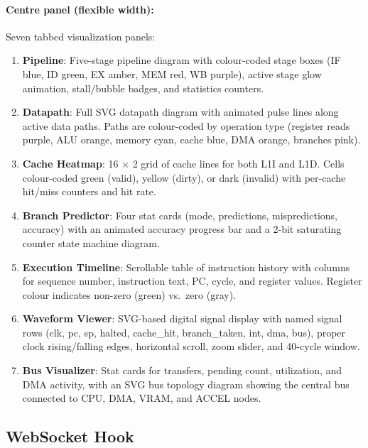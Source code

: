 \documentclass[12pt,a4paper,twoside]{book}
\theoremstyle{trinarytheorem}
\theoremstyle{trinarydefinition}
\begin{document}
\paragraph{Centre panel (flexible width):} Seven tabbed visualization
panels:

\begin{enumerate}
    \item \textbf{Pipeline}: Five-stage pipeline diagram with
          colour-coded stage boxes (IF blue, ID green, EX amber, MEM red,
          WB purple), active stage glow animation, stall/bubble badges,
          and statistics counters.
    \item \textbf{Datapath}: Full SVG datapath diagram with animated
          pulse lines along active data paths. Paths are colour-coded by
          operation type (register reads purple, ALU orange, memory cyan,
          cache blue, DMA orange, branches pink).
    \item \textbf{Cache Heatmap}: 16 $\times$ 2 grid of cache lines for
          both L1I and L1D. Cells colour-coded green (valid), yellow
          (dirty), or dark (invalid) with per-cache hit/miss counters
          and hit rate.
    \item \textbf{Branch Predictor}: Four stat cards (mode, predictions,
          mispredictions, accuracy) with an animated accuracy progress
          bar and a 2-bit saturating counter state machine diagram.
    \item \textbf{Execution Timeline}: Scrollable table of instruction
          history with columns for sequence number, instruction text, PC,
          cycle, and register values. Register colour indicates non-zero
          (green) vs.\ zero (gray).
    \item \textbf{Waveform Viewer}: SVG-based digital signal display
          with named signal rows (clk, pc, sp, halted, cache\_hit,
          branch\_taken, int, dma, bus), proper clock rising/falling
          edges, horizontal scroll, zoom slider, and 40-cycle window.
    \item \textbf{Bus Visualizer}: Stat cards for transfers, pending
          count, utilization, and DMA activity, with an SVG bus topology
          diagram showing the central bus connected to CPU, DMA, VRAM,
          and ACCEL nodes.
\end{enumerate}

\subsection{WebSocket Hook}
\end{document}
